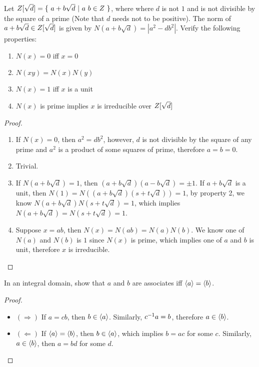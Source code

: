 \documentclass[../main.tex]{subfiles}
\begin{document}
\begin{exercise}
  Let $\poly[\sqrt{d}]{Z} = \set{a + b \sqrt{d}}{a \ b \in Z}$,
  where where $d$ is not $1$ and is not divisible by the square of a prime
  (Note that $d$ needs not to be positive).
  The norm of $a + b \sqrt{d} \in \poly[\sqrt{d}]{Z}$ is given by
  $N(a + b \sqrt{d}) = |a^2 - db^2|$.  
  Verify the following properties:
  \begin{enumerate}
    \item $N(x) = 0$ iff $x = 0$
    \item $N(xy) = N(x)N(y)$
    \item $N(x) = 1$ iff $x$ is a unit
    \item $N(x)$ is prime implies $x$ is irreducible over $\poly[\sqrt{d}]{Z}$
  \end{enumerate}
\end{exercise}
\begin{proof}
  ~
  \begin{enumerate}
    \item If $N(x) = 0$, then $a^2 = db^2$, however, 
          $d$ is not divisible by the square of any prime and $a^2$ is a product
          of some squares of prime, therefore $a = b = 0$.
    \item Trivial.
    \item If $N(a + b \sqrt{d}) = 1$, then $(a + b \sqrt{d})(a - b \sqrt{d}) = \pm 1$.
          If $a + b \sqrt{d}$ is a unit, then $N(1) = N((a + b \sqrt{d})(s + t \sqrt{d})) = 1$,
          by property 2, we know $N(a + b \sqrt{d})N(s + t \sqrt{d}) = 1$, which implies
          $N(a + b \sqrt{d}) = N(s + t \sqrt{d}) = 1$.
    \item Suppose $x = ab$, then $N(x) = N(ab) = N(a)N(b)$.
          We know one of $N(a)$ and $N(b)$ is $1$ since $N(x)$ is prime, which implies
          one of $a$ and $b$ is unit, therefore $x$ is irreducible. 
  \end{enumerate}
\end{proof}

\begin{exercise}
  In an integral domain, show that $a$ and $b$ are associates iff $\cyc{a} = \cyc{b}$.
\end{exercise}
\begin{proof}
  ~
  \begin{itemize}
    \item $(\Rightarrow)$ If $a = cb$, then $b \in \cyc{a}$. Similarly, $\inv{c}a = b$,
          therefore $a \in \cyc{b}$.
    \item $(\Leftarrow)$ If $\cyc{a} = \cyc{b}$, then $b \in \cyc{a}$, which implies $b = ac$ for some $c$.
          Similarly, $a \in \cyc{b}$, then $a = bd$ for some $d$.
  \end{itemize}
\end{proof}
\end{document}

